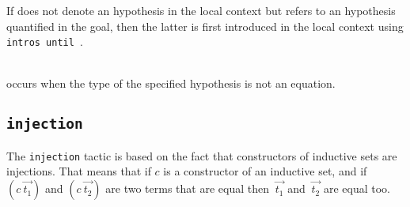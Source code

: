 \Rem If {\ident} does not denote an hypothesis in the local context
but refers to an hypothesis quantified in the goal, then the
latter is first introduced in the local context using
\texttt{intros until \ident}.

\begin{ErrMsgs}
\item {\ident}  \\
  occurs when the type of the specified hypothesis is not an equation.
\end{ErrMsgs}  


\subsection{\tt injection {\ident}
\label{injection}
}

The {\tt injection} tactic is based on the fact that constructors of
inductive sets are injections. That means that if $c$ is a constructor
of an inductive set, and if $(c~\vec{t_1})$ and $(c~\vec{t_2})$ are two
terms that are equal then $~\vec{t_1}$ and $~\vec{t_2}$ are equal
too.

